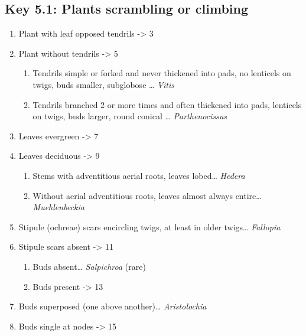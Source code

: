 \documentclass[openany]{book}
\providecommand{\tightlist}{%
  \setlength{\itemsep}{0pt}\setlength{\parskip}{0pt}}
\begin{document}
\hypertarget{key-5.1-plants-scrambling-or-climbing}{%
\subsection{Key 5.1: Plants scrambling or
climbing}\label{key-5.1-plants-scrambling-or-climbing}}

\begin{enumerate}
\def\labelenumi{\arabic{enumi}.}
\tightlist
\item
  Plant with leaf opposed tendrils -\textgreater{} 3
\item
  Plant without tendrils -\textgreater{} 5

  \begin{enumerate}
  \def\labelenumii{\arabic{enumii}.}
  \setcounter{enumii}{2}
  \tightlist
  \item
    Tendrils simple or forked and never thickened into pads, no
    lenticels on twigs, buds smaller, subglobose \ldots{} \emph{Vitis}
  \item
    Tendrils branched 2 or more times and often thickened into pads,
    lenticels on twigs, buds larger, round conical \ldots{}
    \emph{Parthenocissus}
  \end{enumerate}
\item
  Leaves evergreen -\textgreater{} 7
\item
  Leaves deciduous -\textgreater{} 9

  \begin{enumerate}
  \def\labelenumii{\arabic{enumii}.}
  \setcounter{enumii}{6}
  \tightlist
  \item
    Stems with adventitious aerial roots, leaves lobed\ldots{}
    \emph{Hedera}
  \item
    Without aerial adventitious roots, leaves almost always
    entire\ldots{} \emph{Muehlenbeckia}
  \end{enumerate}
\item
  Stipule (ochreae) scars encircling twigs, at least in older
  twigs\ldots{} \emph{Fallopia}
\item
  Stipule scars absent -\textgreater{} 11

  \begin{enumerate}
  \def\labelenumii{\arabic{enumii}.}
  \setcounter{enumii}{10}
  \tightlist
  \item
    Buds absent\ldots{} \emph{Salpichroa} (rare)
  \item
    Buds present -\textgreater{} 13
  \end{enumerate}
\item
  Buds superposed (one above another)\ldots{} \emph{Aristolochia}
\item
  Buds single at nodes -\textgreater{} 15


\end{enumerate}
\end{document}
